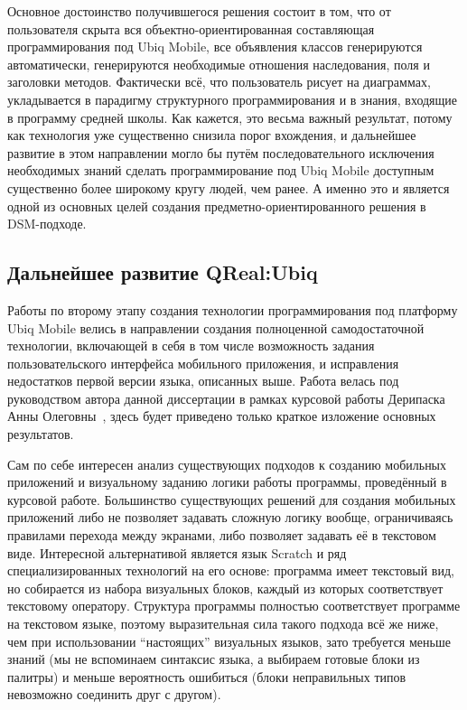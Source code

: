 Основное достоинство получившегося решения состоит в том, что от пользователя скрыта 
вся объектно-ориентированная составляющая программирования под Ubiq Mobile, все объявления 
классов генерируются автоматически, генерируются необходимые отношения наследования, 
поля и заголовки методов. Фактически всё, что пользователь рисует на диаграммах, укладывается 
в парадигму структурного программирования и в знания, входящие в программу средней 
школы. Как кажется, это весьма важный результат, потому как технология уже существенно 
снизила порог вхождения, и дальнейшее развитие в этом направлении могло бы путём последовательного 
исключения необходимых знаний сделать программирование под Ubiq Mobile доступным существенно 
более широкому кругу людей, чем ранее. А именно это и является одной из основных целей 
создания предметно-ориентированного решения в DSM-подходе.

\subsection{Дальнейшее развитие QReal:Ubiq}
\label{chapter:advancedQRealUbiq}
Работы по второму этапу создания технологии программирования под платформу Ubiq Mobile 
велись в направлении создания полноценной самодостаточной технологии, включающей в себя 
в том числе возможность задания пользовательского интерфейса мобильного приложения, 
и исправления недостатков первой версии языка, описанных выше. Работа велась под руководством 
автора данной диссертации в рамках курсовой работы Дерипаска Анны Олеговны~\cite{deripaska2013course}, 
здесь будет приведено только краткое изложение основных результатов.

Сам по себе интересен анализ существующих подходов к созданию мобильных приложений 
и визуальному заданию логики работы программы, проведённый в курсовой работе. Большинство 
существующих решений для создания мобильных приложений либо не позволяет задавать 
сложную логику вообще, ограничиваясь правилами перехода между экранами, либо позволяет 
задавать её в текстовом виде. Интересной альтернативой является язык Scratch и ряд 
специализированных технологий на его основе: программа имеет текстовый вид, но собирается 
из набора визуальных блоков, каждый из которых соответствует текстовому оператору. 
Структура программы полностью соответствует программе на текстовом языке, поэтому 
выразительная сила такого подхода всё же ниже, чем при использовании "`настоящих"' 
визуальных языков, зато требуется меньше знаний (мы не вспоминаем синтаксис языка, 
а выбираем готовые блоки из палитры) и меньше вероятность ошибиться (блоки неправильных 
типов невозможно соединить друг с другом).


